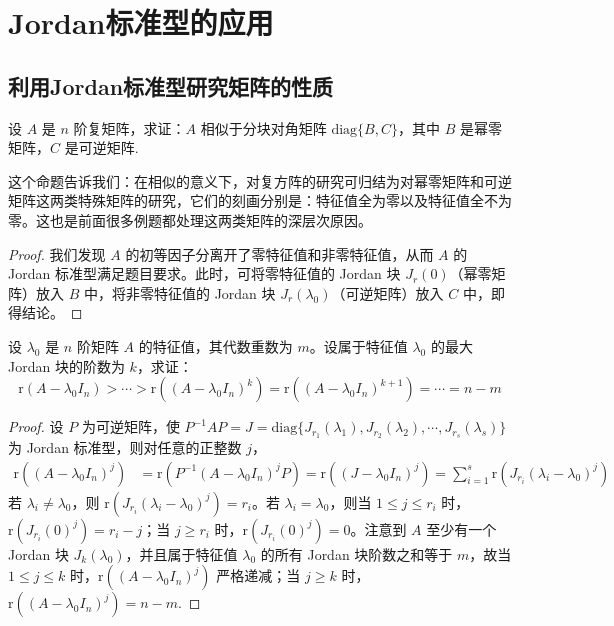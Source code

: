 \documentclass[../../main.tex]{subfiles}%
\begin{document}
\section{Jordan标准型的应用}

\subsection{利用Jordan标准型研究矩阵的性质}

\begin{proposition}\label{proposition:矩阵相似于分块幂零,可逆块}
设 $A$ 是 $n$ 阶复矩阵，求证：$A$ 相似于分块对角矩阵 $\mathrm{diag}\{B,C\}$，其中 $B$ 是幂零矩阵，$C$ 是可逆矩阵.
\end{proposition}
\begin{remark}
这个命题告诉我们：在相似的意义下，对复方阵的研究可归结为对幂零矩阵和可逆矩阵这两类特殊矩阵的研究，它们的刻画分别是：特征值全为零以及特征值全不为零。这也是前面很多例题都处理这两类矩阵的深层次原因。 
\end{remark}
\begin{proof}
我们发现 $A$ 的初等因子分离开了零特征值和非零特征值，从而 $A$ 的 Jordan 标准型满足题目要求。此时，可将零特征值的 Jordan 块 $J_r(0)$（幂零矩阵）放入 $B$ 中，将非零特征值的 Jordan 块 $J_r(\lambda_0)$（可逆矩阵）放入 $C$ 中，即得结论。
\end{proof}

\begin{theorem}
设 $\lambda_0$ 是 $n$ 阶矩阵 $A$ 的特征值，其代数重数为 $m$。设属于特征值 $\lambda_0$ 的最大 Jordan 块的阶数为 $k$，求证：
\[\mathrm{r}(A - \lambda_0I_n) > \cdots > \mathrm{r}((A - \lambda_0I_n)^k) = \mathrm{r}((A - \lambda_0I_n)^{k + 1}) = \cdots = n - m\]
\end{theorem}
\begin{proof}
设 $P$ 为可逆矩阵，使 $P^{-1}AP = J = \mathrm{diag}\{J_{r_1}(\lambda_1),J_{r_2}(\lambda_2),\cdots,J_{r_s}(\lambda_s)\}$ 为 Jordan 标准型，则对任意的正整数 $j$，
\begin{align*}
\mathrm{r}((A - \lambda_0I_n)^j) &= \mathrm{r}(P^{-1}(A - \lambda_0I_n)^jP) = \mathrm{r}((J - \lambda_0I_n)^j) = \sum_{i = 1}^{s}\mathrm{r}(J_{r_i}(\lambda_i - \lambda_0)^j)
\end{align*}
若 $\lambda_i \neq \lambda_0$，则 $\mathrm{r}(J_{r_i}(\lambda_i - \lambda_0)^j) = r_i$。若 $\lambda_i = \lambda_0$，则当 $1 \leqslant  j \leqslant  r_i$ 时，$\mathrm{r}(J_{r_i}(0)^j) = r_i - j$；当 $j \geqslant  r_i$ 时，$\mathrm{r}(J_{r_i}(0)^j) = 0$。注意到 $A$ 至少有一个 Jordan 块 $J_k(\lambda_0)$，并且属于特征值 $\lambda_0$ 的所有 Jordan 块阶数之和等于 $m$，故当 $1 \leqslant  j \leqslant  k$ 时，$\mathrm{r}((A - \lambda_0I_n)^j)$ 严格递减；当 $j \geqslant  k$ 时，$\mathrm{r}((A - \lambda_0I_n)^j) = n - m$.
\end{proof}
\end{document}
